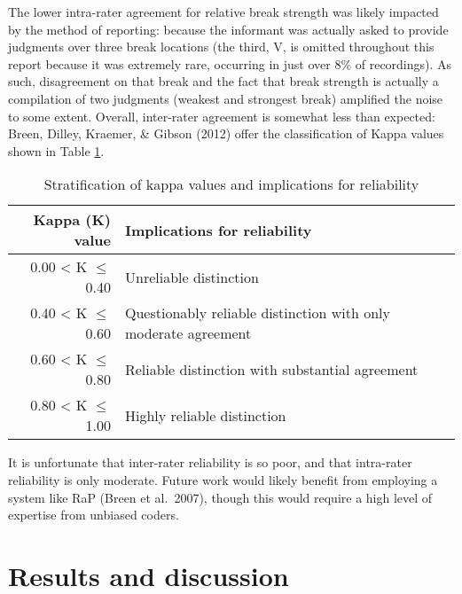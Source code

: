 \documentclass[11pt,oneside]{book}
\begin{document}
The lower intra-rater agreement for relative break strength was likely impacted by the method of reporting: because the informant was actually asked to provide judgments over three break locations (the third, V, is omitted throughout this report because it was extremely rare, occurring in just over 8\% of recordings). As such, disagreement on that break and the fact that break strength is actually a compilation of two judgments (weakest and strongest break) amplified the noise to some extent. Overall, inter-rater agreement is somewhat less than expected: Breen, Dilley, Kraemer, \& Gibson (2012) offer the classification of Kappa values shown in Table \ref{tab:agreements}.

\begin{table}[!h]

\caption{\label{tab:agreements}Stratification of kappa values and implications for reliability}
\centering
\begin{tabular}{rlrl}
\toprule
Kappa (K) value & Implications for reliability\\
\midrule
0.00 < K $\leq$ 0.40 & Unreliable distinction\\
0.40 < K $\leq$ 0.60 & Questionably reliable distinction with only moderate agreement\\
0.60 < K $\leq$ 0.80 & Reliable distinction with substantial agreement\\
0.80 < K $\leq$ 1.00 & Highly reliable distinction\\
\bottomrule
\end{tabular}
\end{table}

It is unfortunate that inter-rater reliability is so poor, and that intra-rater reliability is only moderate. Future work would likely benefit from employing a system like RaP (Breen et al.~2007), though this would require a high level of expertise from unbiased coders.

\hypertarget{res}{%
\chapter{Results and discussion}\label{res}}

\setlength\parindent{24pt}\setlength{\parskip}{0.0pt plus 1.0pt}
\end{document}

